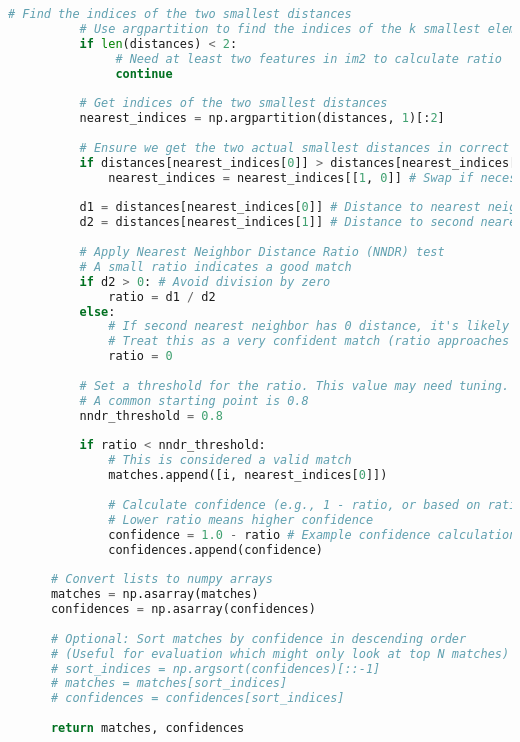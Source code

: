 \begin{lstlisting}[caption={student.py}, label={lst:code-example}, captionpos=t, language=python]
          # Find the indices of the two smallest distances
          # Use argpartition to find the indices of the k smallest elements efficiently
          if len(distances) < 2:
               # Need at least two features in im2 to calculate ratio
               continue
  
          # Get indices of the two smallest distances
          nearest_indices = np.argpartition(distances, 1)[:2]
  
          # Ensure we get the two actual smallest distances in correct order
          if distances[nearest_indices[0]] > distances[nearest_indices[1]]:
              nearest_indices = nearest_indices[[1, 0]] # Swap if necessary
  
          d1 = distances[nearest_indices[0]] # Distance to nearest neighbor
          d2 = distances[nearest_indices[1]] # Distance to second nearest neighbor
  
          # Apply Nearest Neighbor Distance Ratio (NNDR) test
          # A small ratio indicates a good match
          if d2 > 0: # Avoid division by zero
              ratio = d1 / d2
          else:
              # If second nearest neighbor has 0 distance, it's likely an identical feature
              # Treat this as a very confident match (ratio approaches 0)
              ratio = 0
  
          # Set a threshold for the ratio. This value may need tuning.
          # A common starting point is 0.8
          nndr_threshold = 0.8
  
          if ratio < nndr_threshold:
              # This is considered a valid match
              matches.append([i, nearest_indices[0]])
  
              # Calculate confidence (e.g., 1 - ratio, or based on ratio inverse)
              # Lower ratio means higher confidence
              confidence = 1.0 - ratio # Example confidence calculation
              confidences.append(confidence)
  
      # Convert lists to numpy arrays
      matches = np.asarray(matches)
      confidences = np.asarray(confidences)
  
      # Optional: Sort matches by confidence in descending order
      # (Useful for evaluation which might only look at top N matches)
      # sort_indices = np.argsort(confidences)[::-1]
      # matches = matches[sort_indices]
      # confidences = confidences[sort_indices]
  
      return matches, confidences
\end{lstlisting}
